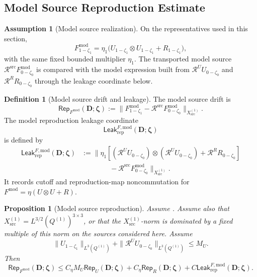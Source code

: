 \documentclass[11pt]{article}
\numberwithin{equation}{section}
\newtheorem{proposition}[proposition]{Proposition}
\theoremstyle{definition}
\newtheorem{definition}[definition]{Definition}
\newtheorem{assumption}[assumption]{Assumption}
\theoremstyle{remark}
\newcommand{\src}{\mathrm{src}}
\newcommand{\rep}{\mathrm{rep}}
\newcommand{\Leak}{\mathsf{Leak}}
\newcommand{\Rep}{\mathsf{Rep}}
\newcommand{\calR}{\mathcal R}
\newcommand{\bD}{\mathbf D}
\newcommand{\bzeta}{\boldsymbol\zeta}
\newcommand{\Xsrc}{X_{\src}}
\begin{document}
\subsection{Model Source Reproduction Estimate}
\label{rep:sec:model-source}

\begin{assumption}[Model source realization]
\label{rep:ass:model-source-realization}
On the representatives used in this section,
\[
    F^{\mathrm{mod}}_{1-\zeta_1}
    =
    \eta_1
    \bigl(
        U_{1-\zeta_1}\otimes U_{1-\zeta_1}
        +
        R_{1-\zeta_1}
    \bigr),
\]
with the same fixed bounded multiplier \(\eta_1\).  The transported model
source \(\calR^{\src}F^{\mathrm{mod}}_{0-\zeta_0}\) is compared with the
model expression built from \(\calR^U U_{0-\zeta_0}\) and
\(\calR^R R_{0-\zeta_0}\) through the leakage coordinate below.
\end{assumption}

\begin{definition}[Model source drift and leakage]
\label{rep:def:model-source-drift}
The model source drift is
\[
    \Rep_{F^{\mathrm{mod}}}(\bD;\bzeta)
    :=
    \|F^{\mathrm{mod}}_{1-\zeta_1}
    -
    \calR^{\src}F^{\mathrm{mod}}_{0-\zeta_0}\|_{\Xsrc^{(1)}}.
\]
The model reproduction leakage coordinate
\[
    \Leak_{\rep}^{F,\mathrm{mod}}(\bD;\bzeta)
\]
is defined by
\[
\begin{aligned}
    \Leak_{\rep}^{F,\mathrm{mod}}(\bD;\bzeta)
    &:=
    \|\eta_1[
        (\calR^U U_{0-\zeta_0})\otimes(\calR^U U_{0-\zeta_0})
        +
        \calR^R R_{0-\zeta_0}
    ]\\
    &\qquad\qquad-
    \calR^{\src}F^{\mathrm{mod}}_{0-\zeta_0}
    \|_{\Xsrc^{(1)}}.
\end{aligned}
\]
It records cutoff and reproduction-map noncommutation for
\(F^{\mathrm{mod}}=\eta(U\otimes U+R)\).
\end{definition}

\begin{proposition}[Model source reproduction]
\label{rep:prop:model-source-reproduction}
Assume .  Assume also that
\(\Xsrc^{(1)}=L^{3/2}(Q^{(1)})^{3\times3}\), or that the
\(\Xsrc^{(1)}\)-norm is dominated by a fixed multiple of this norm on the
sources considered here.
Assume
\[
    \|U_{1-\zeta_1}\|_{L^3(Q^{(1)})}
    +
    \|\calR^U U_{0-\zeta_0}\|_{L^3(Q^{(1)})}
    \le
    M_U.
\]
Then
\[
    \Rep_{F^{\mathrm{mod}}}(\bD;\bzeta)
    \le
    C_\eta M_U\Rep_U(\bD;\bzeta)
    +
    C_\eta\Rep_R(\bD;\bzeta)
    +
    C\Leak_{\rep}^{F,\mathrm{mod}}(\bD;\bzeta).
\]
\end{proposition}
\end{document}
